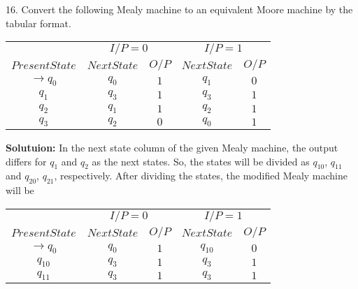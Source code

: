 \documentclass[8pt]{beamer}
\begin{document}
\begin{frame}
16. Convert the following Mealy machine to an equivalent Moore machine by the tabular format.\\

\begin{center}
\begin{tabular}{ccccc}
 \hline

 \hline

 \hline

 \hline
 &  \multicolumn{2}{c}{$I/P = 0$ } &  \multicolumn{2}{c}{$I/P = 1$}  \\
  \cline{2-3}                         \cline{4-5}
 $Present State$ &   $Next State$  & $O/P$ &  $Next State$  & $O/P$\\
\hline
$\rightarrow q_0$  &  $q_0$   &  $1$  &  $q_1$  & $0$ \\
$q_1$             &  $q_3$    &  $1$  &  $q_3$  & $1$ \\
$q_2$             &  $q_1$    &  $1$  &  $q_2$  & $1$ \\
$q_3$             &  $q_2$    &  $0$  &  $q_0$  & $1$ \\

 \hline

 \hline

 \hline

 \hline
\end{tabular}
\end{center}

\vspace*{0.3cm}
\end{frame}

\begin{frame}
\textbf{Solutuion:} In the next state column of the given Mealy machine, the output differs for $q_1$ and $q_2$
as the next states. So, the states will be divided as $q_10$, $q_11$ and $q_20$, $q_21$, respectively. After dividing
the states, the modified Mealy machine will be\\

\vspace*{0.3cm}
\begin{center}
\begin{tabular}{ccccc}
 \hline

 \hline

 \hline

 \hline
 &  \multicolumn{2}{c}{$I/P = 0$ } &  \multicolumn{2}{c}{$I/P = 1$}  \\
  \cline{2-3}                         \cline{4-5}
 $Present State$ &   $Next State$  & $O/P$ &  $Next State$  & $O/P$\\
\hline
$\rightarrow q_0$  &  $q_0$    &  $1$  &  $q_10$  & $0$ \\
$q_10$             &  $q_3$    &  $1$  &  $q_3$   & $1$ \\
$q_11$             &  $q_3$    &  $1$  &  $q_3$   & $1$ \\
 \hline
\end{tabular}
\end{center}

\end{frame}
\end{document}
